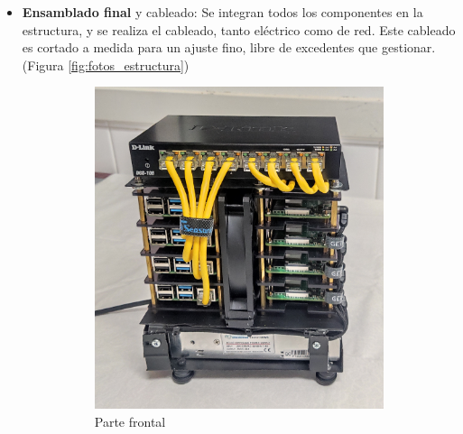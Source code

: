 \begin{itemize}
    \item \textbf{Ensamblado final} y cableado: Se integran todos los componentes en la estructura, y se realiza el cableado, tanto eléctrico como de red. Este cableado es cortado a medida para un ajuste fino, libre de excedentes que gestionar. (Figura \ref{fig:fotos_estructura})

    \begin{figure}[h!]
    \centering
    \begin{subfigure}[c]{0.4\textwidth}
        \includegraphics[width=\textwidth]{img/fotos_estructura/front.jpg}
        \caption{Parte frontal}
        \label{fig:fotos_estructura_front}
    \end{subfigure}
    \begin{subfigure}[c]{0.4\textwidth}

\end{subfigure}
\end{figure}
\end{itemize}
